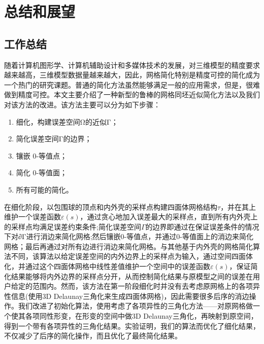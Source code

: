 
\chapter{总结和展望}

\section{工作总结}
随着计算机图形学、计算机辅助设计和多媒体技术的发展，对三维模型的精度要求越来越高，三维模型数据量越来越大，因此，网格简化特别是精度可控的简化成为一个热门的研究课题。普通的简化方法虽然能够满足一般的应用需求，但是，很难做到精度可控。本文主要介绍了一种新型的鲁棒的网格同坯近似简化方法以及我们对该方法的改进。该方法主要可以分为如下步骤：
\begin{enumerate}[（1）]
  \item 细化，构建误差空间Ω的近似Γ；
  \item 简化误差空间Γ的边界；
  \item 镶嵌 0-等值点；
  \item 简化 0-等值面；
  \item 所有可能的简化。
\end{enumerate}
在细化阶段，以包围球的顶点和内外壳的采样点构建四面体网格结构$\tau$，并在其上维护一个误差函数$\varepsilon(s)$，通过贪心地加入误差最大的采样点，直到所有内外壳上的采样点均满足误差约束条件;简化误差空间$\Gamma$的边界即通过在保证误差条件的情况下对∂Γ进行消边来简化网格;然后镶嵌0-等值点，并通过0-等值面上的消边来简化网格；最后再通过对所有边进行消边来简化网格。与其他基于内外壳的网格简化算法不同，该算法以给定误差空间的内外边界上的采样点为输入，通过空间四面体化，并通过这个四面体网格中线性差值维护一个空间中的误差函数$\varepsilon(s)$，保证简化结果能够将内外边界的采样点分开，从而控制简化结果与原模型之间的误差在用户给定的范围内。然而，该方法在第一阶段细化时并没有去考虑原网格上的各项异性信息(使用3D Delaunay三角化来生成四面体网格)，因此需要很多后序的消边操作。我们改进了初始化算法，使用考虑了各项异性的三角化方法——对原网格做一个使其各项同性形变，在形变的空间中做3D Delaunay三角化，再映射到原空间，得到一个带有各项异性的三角化结果。实验证明，我们的算法而优化了细化结果，不仅减少了后序的简化操作，而且优化了最终简化结果。
